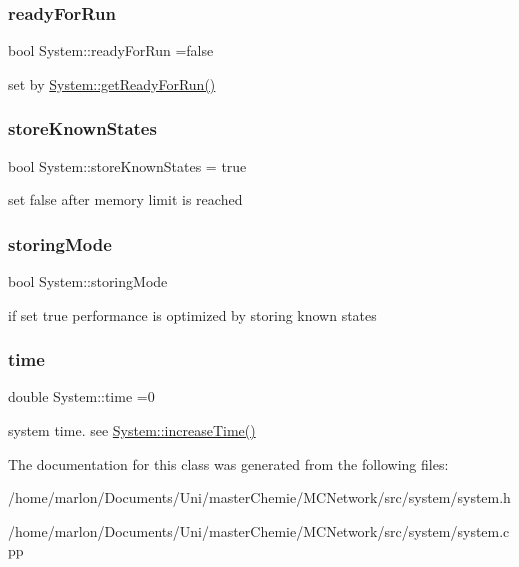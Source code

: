 \subsubsection{\texorpdfstring{ready\+For\+Run}{readyForRun}}
{\footnotesize\ttfamily bool System\+::ready\+For\+Run =false\hspace{0.3cm}{\ttfamily [private]}}

set by \hyperlink{classSystem_a943bc42d8dc42ae1aaf1a5798ce723b8}{System\+::get\+Ready\+For\+Run()} \mbox{\label{classSystem_aa121c1c34382800d39106aa81d9c36f4}} 
\subsubsection{\texorpdfstring{store\+Known\+States}{storeKnownStates}}
{\footnotesize\ttfamily bool System\+::store\+Known\+States = true\hspace{0.3cm}{\ttfamily [private]}}

set false after memory limit is reached \mbox{\label{classSystem_afe51eb9409a63748242e0a987c98caf0}} 
\subsubsection{\texorpdfstring{storing\+Mode}{storingMode}}
{\footnotesize\ttfamily bool System\+::storing\+Mode\hspace{0.3cm}{\ttfamily [private]}}

if set true performance is optimized by storing known states \mbox{\label{classSystem_aa9e002a5f2f169e37c545b76ee67e724}} 
\subsubsection{\texorpdfstring{time}{time}}
{\footnotesize\ttfamily double System\+::time =0}

system time. see \hyperlink{classSystem_a6167b888fa30f9d8fa56a246c5f461b9}{System\+::increase\+Time()} 

The documentation for this class was generated from the following files\+:\begin{DoxyCompactItemize}
\item 
/home/marlon/\+Documents/\+Uni/master\+Chemie/\+M\+C\+Network/src/system/system.\+h\item 
/home/marlon/\+Documents/\+Uni/master\+Chemie/\+M\+C\+Network/src/system/system.\+cpp\end{DoxyCompactItemize}
